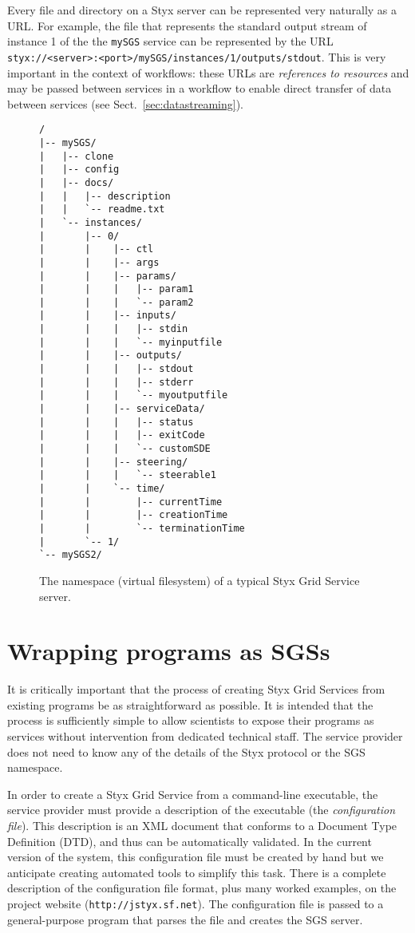 \documentclass{llncs}
\begin{document}
Every file and directory on a Styx server can be represented very naturally as a URL.  For example, the file that represents the standard output stream of instance 1 of the the {\tt mySGS} service can be represented by the URL {\tt styx://<server>:<port>/mySGS/instances/1/outputs/stdout}.  This is very important in the context of workflows: these URLs are {\em references to resources\/} and may be passed between services in a workflow to enable direct transfer of data between services (see Sect.~\ref{sec:datastreaming}).

\begin{figure}
\begin{verbatim}
/
|-- mySGS/
|   |-- clone
|   |-- config
|   |-- docs/
|   |   |-- description
|   |   `-- readme.txt
|   `-- instances/
|       |-- 0/
|       |    |-- ctl
|       |    |-- args
|       |    |-- params/
|       |    |   |-- param1
|       |    |   `-- param2
|       |    |-- inputs/
|       |    |   |-- stdin
|       |    |   `-- myinputfile
|       |    |-- outputs/
|       |    |   |-- stdout
|       |    |   |-- stderr
|       |    |   `-- myoutputfile
|       |    |-- serviceData/
|       |    |   |-- status
|       |    |   |-- exitCode
|       |    |   `-- customSDE
|       |    |-- steering/
|       |    |   `-- steerable1
|       |    `-- time/
|       |        |-- currentTime
|       |        |-- creationTime
|       |        `-- terminationTime
|       `-- 1/
`-- mySGS2/
\end{verbatim}
\caption{The namespace (virtual filesystem) of a typical Styx Grid Service server.}\label{fig:sgsnamespace}
\end{figure}
%
\section{Wrapping programs as SGSs}
It is critically important that the process of creating Styx Grid Services from existing programs be as straightforward as possible.  It is intended that the process is sufficiently simple to allow scientists to expose their programs as services without intervention from dedicated technical staff.  The service provider does not need to know any of the details of the Styx protocol or the SGS namespace.

In order to create a Styx Grid Service from a command-line executable, the service provider must provide a description of the executable (the {\em configuration file\/}).  This description is an XML document that conforms to a Document Type Definition (DTD), and thus can be automatically validated.  In the current version of the system, this configuration file must be created by hand but we anticipate creating automated tools to simplify this task.  There is a complete description of the configuration file format, plus many worked examples, on the project website ({\tt http://jstyx.sf.net}).  The configuration file is passed to a general-purpose program that parses the file and creates the SGS server.
\end{document}
